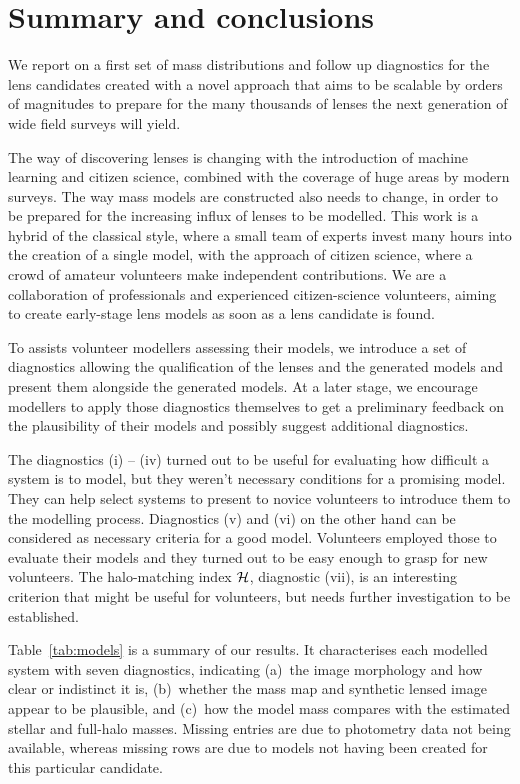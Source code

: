 \section{Summary and conclusions}\label{sec:summary}


We report on a first set of mass distributions and follow up diagnostics for 
the {\SW} lens candidates created with a novel approach that aims to be scalable 
by orders of magnitudes to prepare for the many thousands of lenses the next 
generation of wide field surveys will yield.

The way of discovering lenses is changing with the introduction of
machine learning and citizen science, combined with the coverage of
huge areas by modern surveys.  The way mass models are constructed also needs to
change, in order to be prepared for the increasing influx of lenses to
be modelled.  This work is a hybrid of the classical style, where a
small team of experts invest many hours into the creation of a single
model, with the approach of citizen science, where a crowd of amateur
volunteers make independent contributions.  We are a collaboration of
professionals and experienced citizen-science volunteers, aiming to
create early-stage lens models as soon as a lens candidate is found.


To assists volunteer modellers assessing their models, we introduce a
set of diagnostics allowing the qualification of the lenses and the
generated models and present them alongside the generated models. At a
later stage, we encourage modellers to apply those diagnostics
themselves to get a preliminary feedback on the plausibility of their
models and possibly suggest additional diagnostics.

The diagnostics (i) -- (iv) turned out to be useful for evaluating how difficult a system is to model, but they weren't necessary conditions for a promising model.
They can help select systems to present to novice volunteers to introduce them to the modelling process.
Diagnostics (v) and (vi) on the other hand can be considered as necessary criteria for a good model.
Volunteers employed those to evaluate their models and they turned out to be easy enough to grasp for new volunteers.
The halo-matching index $\mathcal{H}$, diagnostic (vii), is an interesting criterion that might be useful for volunteers, but needs further investigation to be established.


Table~\ref{tab:models} is a summary of our results.  It characterises
each modelled system with seven diagnostics, indicating (a)~the image
morphology and how clear or indistinct it is, (b)~whether the mass map
and synthetic lensed image appear to be plausible, and (c)~how the
model mass compares with the estimated stellar and full-halo masses.
Missing entries are due to photometry data not being available, whereas
missing rows are due to models not having been created for this particular
candidate.

